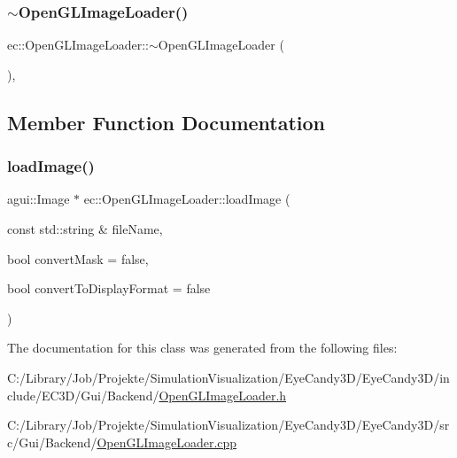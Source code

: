 \subsubsection{\texorpdfstring{$\sim$\+Open\+G\+L\+Image\+Loader()}{~OpenGLImageLoader()}}
{\footnotesize\ttfamily ec\+::\+Open\+G\+L\+Image\+Loader\+::$\sim$\+Open\+G\+L\+Image\+Loader (\begin{DoxyParamCaption}{ }\end{DoxyParamCaption})\hspace{0.3cm}{\ttfamily [virtual]}, {\ttfamily [default]}}



\subsection{Member Function Documentation}
\mbox{\label{classec_1_1_open_g_l_image_loader_a0e552f6d59a9fe5fd9208d7c664e67b7}} 
\subsubsection{\texorpdfstring{load\+Image()}{loadImage()}}
{\footnotesize\ttfamily agui\+::\+Image $\ast$ ec\+::\+Open\+G\+L\+Image\+Loader\+::load\+Image (\begin{DoxyParamCaption}\item[{const std\+::string \&}]{file\+Name,  }\item[{bool}]{convert\+Mask = {\ttfamily false},  }\item[{bool}]{convert\+To\+Display\+Format = {\ttfamily false} }\end{DoxyParamCaption})\hspace{0.3cm}{\ttfamily [override]}}



The documentation for this class was generated from the following files\+:\begin{DoxyCompactItemize}
\item 
C\+:/\+Library/\+Job/\+Projekte/\+Simulation\+Visualization/\+Eye\+Candy3\+D/\+Eye\+Candy3\+D/include/\+E\+C3\+D/\+Gui/\+Backend/\mbox{\hyperlink{_open_g_l_image_loader_8h}{Open\+G\+L\+Image\+Loader.\+h}}\item 
C\+:/\+Library/\+Job/\+Projekte/\+Simulation\+Visualization/\+Eye\+Candy3\+D/\+Eye\+Candy3\+D/src/\+Gui/\+Backend/\mbox{\hyperlink{_open_g_l_image_loader_8cpp}{Open\+G\+L\+Image\+Loader.\+cpp}}\end{DoxyCompactItemize}
